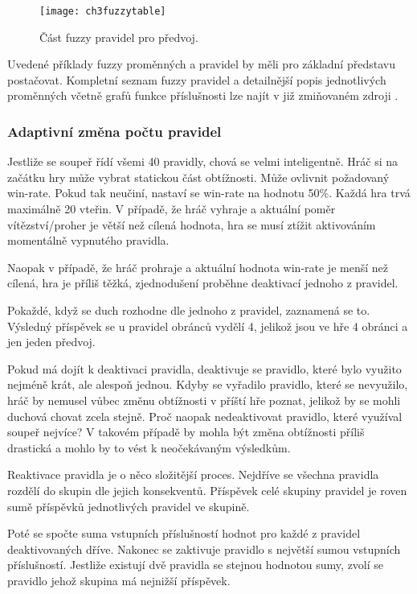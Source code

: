 \begin{figure}
  \centering
  \texttt{[image: ch3fuzzytable]}
	\caption{Část fuzzy pravidel pro předvoj. \cite{25deadend} }
	\label{fig-ch3fuzzytable}
\end{figure}

Uvedené příklady fuzzy proměnných a pravidel by měli pro základní představu postačovat. Kompletní seznam fuzzy pravidel a detailnější popis jednotlivých proměnných včetně grafů funkce příslušnosti lze najít v již zmiňovaném zdroji \cite{25deadend}.

\subsubsection{Adaptivní změna počtu pravidel}

Jestliže se soupeř řídí všemi 40 pravidly, chová se velmi inteligentně. Hráč si na začátku hry může vybrat statickou část obtížnosti. Může ovlivnit požadovaný win-rate. Pokud tak neučiní, nastaví se win-rate na hodnotu 50\%. Každá hra trvá maximálně 20 vteřin. V případě, že hráč vyhraje a aktuální poměr vítězství/proher  je větší než cílená hodnota, hra se musí ztížit aktivováním momentálně vypnutého pravidla.

Naopak v případě, že hráč prohraje a aktuální hodnota win-rate je menší než cílená, hra je příliš těžká, zjednodušení proběhne deaktivací jednoho z pravidel.

Pokaždé, když se duch rozhodne dle jednoho z pravidel, zaznamená se to. Výsledný příspěvek se u pravidel obránců vydělí 4, jelikož jsou ve hře 4 obránci a jen jeden předvoj.

Pokud má dojít k deaktivaci pravidla, deaktivuje se pravidlo, které bylo využito nejméně krát, ale alespoň jednou. Kdyby se vyřadilo pravidlo, které se nevyužilo, hráč by nemusel vůbec změnu obtížnosti v příští hře poznat, jelikož by se mohli duchová chovat zcela stejně. Proč naopak nedeaktivovat pravidlo, které využíval soupeř nejvíce? V takovém případě by mohla být změna obtížnosti příliš drastická a mohlo by to vést k neočekávaným výsledkům.

Reaktivace pravidla je o něco složitější proces. Nejdříve se všechna pravidla rozdělí do skupin dle jejich konsekventů. Příspěvek celé skupiny pravidel je roven sumě příspěvků jednotlivých pravidel ve skupině. 

Poté se spočte suma vstupních příslušností hodnot pro každé z pravidel deaktivovaných dříve. Nakonec se zaktivuje pravidlo s největší sumou vstupních příslušností. Jestliže existují dvě pravidla se stejnou hodnotou sumy, zvolí se pravidlo jehož skupina má nejnižší příspěvek.


